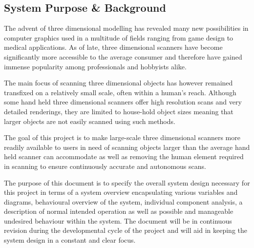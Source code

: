 \documentclass[10pt,letterpaper]{article}
\begin{document}
\subsection{System Purpose \& Background}
The advent of three dimensional modelling has revealed many new possibilities in computer graphics used in a multitude of fields ranging from game design to medical applications. As of late, three dimensional scanners have become significantly more accessible to the average consumer and therefore have gained immense popularity among professionals and hobbyists alike. \par 
The main focus of scanning three dimensional objects has however remained transfixed on a relatively small scale, often within a human's reach. Although some hand held three dimensional scanners offer high resolution scans and very detailed renderings, they are limited to house-hold object sizes meaning that larger objects are not easily scanned using such methods. \par 
The goal of this project is to make large-scale three dimensional scanners more readily available to users in need of scanning objects larger than the average hand held scanner can accommodate as well as removing the human element required in scanning to ensure continuously accurate and autonomous scans. \par 
The purpose of this document is to specify the overall system design necessary for this project in terms of a system overview encapsulating various variables and diagrams, behavioural overview of the system, individual component analysis, a description of normal intended operation as well as possible and manageable undesired behaviour within the system. The document will be in continuous revision during the developmental cycle of the project and will aid in keeping the system design in a constant and clear focus.
\end{document}
